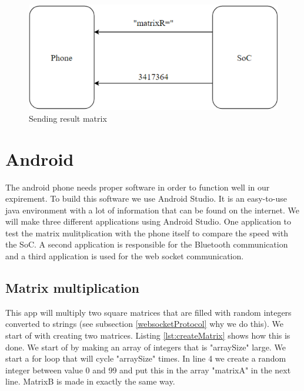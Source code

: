 \documentclass[a4paper, 11pt]{report}
\begin{document}
\begin{figure}[ht]
\centering
\includegraphics[scale=0.7]{images/webSocketCom2.pdf}
\caption{Sending result matrix}\label{fig:ResultMatrix}
\end{figure}

\section{Android}
The android phone needs proper software in order to function well in our expirement. To build this software we use Android Studio. It is an easy-to-use java environment with a lot of information that can be found on the internet. We will make three different applications using Android Studio. One application to test the matrix mulitplication with the phone itself to compare the speed with the SoC. A second application is responsible for the Bluetooth communication and a third application is used for the web socket communication.

	\subsection{Matrix multiplication}
This app will multiply two square matrices that are filled with random integers converted to strings (see subsection \ref{websocketProtocol} why we do this). We start of with creating two matrices. Listing \ref{lst:createMatrix} shows how this is done. We start of by making an array of integers that is "arraySize" large. We start a for loop that will cycle "arraySize" times. In line 4 we create a random integer between value 0 and 99 and put this in the array "matrixA" in the next line. MatrixB is made in exactly the same way.
\end{document}
